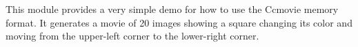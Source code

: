 This module provides a very simple demo for how to use the Ccmovie memory
format.
It generates a movie of 20 images showing a square changing its
color and moving from the upper-left corner to the lower-right corner.
